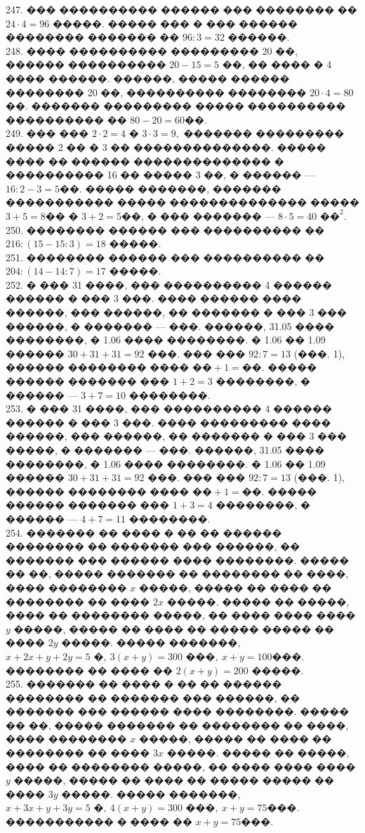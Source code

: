 \documentclass[12pt]{article}
\begin{document}
247. ��� ���������� ������ ��� �������� �� $24\cdot4=96$ �����. ����� ��� � ��� ������ �������� ������� �� $96:3=32$ ������.\\
248. ���� ���������� ��������� 20 ��, ������ ���������� $20-15=5$ ��, �� ���� � 4 ���� ������. ������, ����� ������ �������� 20 ��, ���������� �������� $20\cdot4=80$��. ������� ��������� ����� ���������� ���������� �� $80-20=60$��.\\
249. ��� ��� $2\cdot2=4$ � $3\cdot3=9,$ ������� ��������� ����� 2 �� � 3 �� ��������������. ����� ���� �� ������ �������������� � ���������� 16 �� ����� 3 ��, � ������ --- $16:2-3=5$��. ����� �������, ������� ����������� ����� �������������� ����� $3+5=8$�� � $3+2=5$��, � ��� ������� --- $8\cdot5=40\text{ ��}^2.$\\
250. �������� ������ ��� ���������� �� $216:(15-15:3)=18$ �����.\\
251. �������� ������ ��� ���������� �� $204:(14-14:7)=17$ �����.\\
252. � ��� 31 ����, ��� ���������� 4 ������ ������ � ��� 3 ���. ���� ������ ���� ������, ��� ������, �� ������� � ��� 3 ��� ������, � ������� --- ���. ������, 31.05 ���� ��������, � 1.06 ���� ��������. � 1.06 �� 1.09 ������ $30+31+31=92$ ���. ��� ��� $92:7=13$ (���. 1), ������ �������� ���� $\text{��}+1=\text{��}.$ ����� ������ ������� ��� $1+2=3$ ��������, � ������ --- $3+7=10$ ��������.\\
253. � ��� 31 ����, ��� ���������� 4 ������ ������ � ��� 3 ���. ���� ��������� ���� ������, ��� ������, �� ������� � ��� 3 ��� �����, � ������� --- ���. ������, 31.05 ���� ��������, � 1.06 ���� ��������. � 1.06 �� 1.09 ������ $30+31+31=92$ ���. ��� ��� $92:7=13$ (���. 1), ������ �������� ���� $\text{��}+1=\text{��}.$ ����� ������ ������� ��� $1+3=4$ ��������, � ������ --- $4+7=11$ ��������.\\
254. ������� �� ���� � �� �� ������ �������� �� ������� ��� ������, �� ������� ��� ������ ���� ��������. ����� �� ��, ����� ������� �� �������� �� ����, ���� �������� $x$ �����, ����� �� ���� �� �������� �� ���� $2x$ �����. ����� �� �����, ���� �� �������� �����, �� ���� ���� ���� $y$ �����, ����� �� ���� �� ����� ����� �� ���� $2y$ �����. ����� �������, $x+2x+y+2y=5\text{ �},\ 3(x+y)=300\text{ ���},\ x+y=100$���. �������� �� ���� �� $2(x+y)=200$ �����.\\
255. ������� �� ���� � �� �� ������ �������� �� ������� ��� ������, �� ������� ��� ������ ���� ��������. ����� �� ��, ����� ������� �� �������� �� ����, ���� �������� $x$ �����, ����� �� ���� �� �������� �� ���� $3x$ �����. ����� �� �����, ���� �� �������� �����, �� ���� ���� ���� $y$ �����, ����� �� ���� �� ����� ����� �� ���� $3y$ �����. ����� �������, $x+3x+y+3y=5\text{ �},\ 4(x+y)=300\text{ ���},\ x+y=75$���. ����������� � ���� �� $x+y=75$���.\\
\end{document}

